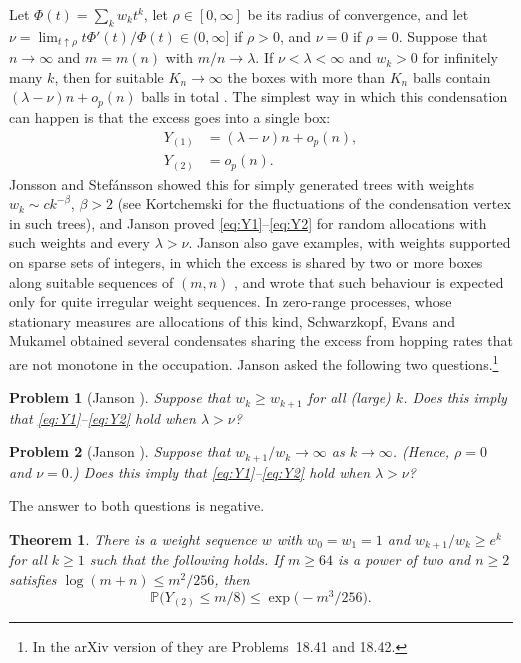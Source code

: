 \documentclass[11pt]{amsart}
\newtheorem{theorem}{Theorem}[section]
\newtheorem*{problem*}{Problem}
\theoremstyle{remark}
\numberwithin{equation}{section}
\newcommand{\Pp}{\mathbb P}
\begin{document}
Let $\Phi(t)=\sum_kw_kt^k$, let $\rho\in[0,\infty]$ be its radius of convergence, and let $\nu=\lim_{t\uparrow\rho}t\Phi'(t)/\Phi(t)\in(0,\infty]$ if $\rho>0$, and $\nu=0$ if $\rho=0$. Suppose that $n\to\infty$ and $m=m(n)$ with $m/n\to\lambda$. If $\nu<\lambda<\infty$ and $w_k>0$ for infinitely many $k$, then for suitable $K_n\to\infty$ the boxes with more than $K_n$ balls contain $(\lambda-\nu)n+o_p(n)$ balls in total \cite[Lemma~19.32]{J12}. The simplest way in which this condensation can happen is that the excess goes into a single box:
\begin{align}
Y_{(1)}&=(\lambda-\nu)n+o_p(n),\label{eq:Y1}\\
Y_{(2)}&=o_p(n).\label{eq:Y2}
\end{align}
Jonsson and Stef\'ansson \cite{JS11} showed this for simply generated trees with weights $w_k\sim ck^{-\beta}$, $\beta>2$ (see Kortchemski \cite{Kor15} for the fluctuations of the condensation vertex in such trees), and Janson \cite[Theorem~19.34]{J12} proved \eqref{eq:Y1}--\eqref{eq:Y2} for random allocations with such weights and every $\lambda>\nu$. Janson also gave examples, with weights supported on sparse sets of integers, in which the excess is shared by two or more boxes along suitable sequences of $(m,n)$ \cite[Examples~19.37 and 19.38]{J12}, and wrote that such behaviour is expected only for quite irregular weight sequences. In zero-range processes, whose stationary measures are allocations of this kind, Schwarzkopf, Evans and Mukamel \cite{SEM08} obtained several condensates sharing the excess from hopping rates that are not monotone in the occupation. Janson asked the following two questions.\footnote{In the arXiv version of \cite{J12} they are Problems~18.41 and 18.42.}

\begin{problem*}[{Janson \cite[Problem~19.42]{J12}}]
Suppose that $w_k\ge w_{k+1}$ for all (large) $k$. Does this imply that \eqref{eq:Y1}--\eqref{eq:Y2} hold when $\lambda>\nu$?
\end{problem*}

\begin{problem*}[{Janson \cite[Problem~19.43]{J12}}]
Suppose that $w_{k+1}/w_k\to\infty$ as $k\to\infty$. (Hence, $\rho=0$ and $\nu=0$.) Does this imply that \eqref{eq:Y1}--\eqref{eq:Y2} hold when $\lambda>\nu$?
\end{problem*}

The answer to both questions is negative.

\begin{theorem}\label{thm:ratio}
There is a weight sequence $w$ with $w_0=w_1=1$ and $w_{k+1}/w_k\ge e^k$ for all $k\ge1$ such that the following holds. If $m\ge64$ is a power of two and $n\ge2$ satisfies $\log(m+n)\le m^2/256$, then
\[
\Pp\bigl(Y_{(2)}\le m/8\bigr)\le\exp\bigl(-m^3/256\bigr).
\]
\end{theorem}
\end{document}

